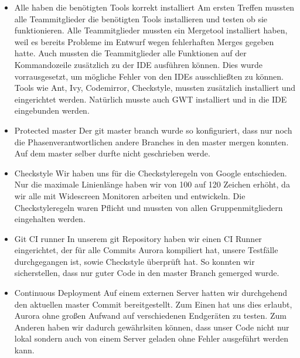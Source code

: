\documentclass[parskip=full,11pt,twoside]{scrartcl}
\begin{document}
\begin{itemize}
	\item Alle haben die benötigten Tools korrekt installiert
	\newline
	Am ersten Treffen mussten alle Teammitglieder die benötigten Tools installieren und testen ob sie funktionieren. 
	Alle Teammitglieder mussten ein Mergetool installiert haben, weil es bereits Probleme im Entwurf wegen fehlerhaften Merges gegeben hatte.
	Auch mussten die Teammitglieder alle Funktionen auf der Kommandozeile zusätzlich 	zu der IDE ausführen können. Dies wurde vorrausgesetzt, um mögliche Fehler von den IDEs ausschließten zu können.
	Tools wie Ant, Ivy, Codemirror, Checkstyle, mussten zusätzlich installiert und eingerichtet werden. 
	Natürlich musste auch GWT installiert und in die IDE eingebunden werden. 
	
    \item Protected master
        \newline
        Der git master branch wurde so konfiguriert, dass nur noch die Phasenverantwortlichen andere Branches in den master mergen konnten. 
        Auf dem master selber durfte nicht geschrieben werde.
    \item Checkstyle
    \newline
    Wir haben uns für die Checkstyleregeln von Google entschieden. Nur die maximale Linienlänge haben wir von 100 auf 120 Zeichen erhöht, da wir alle mit Widescreen Monitoren arbeiten und entwickeln. Die Checkstyleregeln waren Pflicht und mussten von allen Gruppenmitgliedern eingehalten werden.
    \item Git CI runner
        \newline
        In unserem git Repository haben wir einen CI Runner eingerichtet, der für alle Commits Aurora kompiliert hat, unsere Testfälle durchgegangen ist, sowie Checkstyle überprüft hat.
        So konnten wir sicherstellen, dass nur guter Code in den master Branch gemerged wurde.
        
    \item Continuous Deployment
        \newline
        Auf einem externen Server hatten wir durchgehend den aktuellen master Commit bereitgestellt.
        Zum Einen hat uns dies erlaubt, Aurora ohne großen Aufwand auf verschiedenen Endgeräten zu testen.
        Zum Anderen haben wir dadurch gewährlsiten können, dass unser Code nicht nur lokal sondern auch von einem Server geladen ohne Fehler ausgeführt werden kann.
          

\end{itemize}
\end{document}
